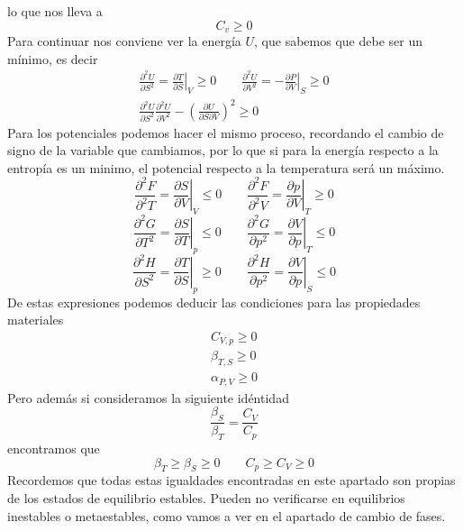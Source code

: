 lo que nos lleva a
\begin{equation}
C_v \geq 0
\end{equation}
Para continuar nos conviene ver la energía $U$, que sabemos que debe ser un mínimo, es decir
\begin{equation}
\begin{gathered}
\frac{\partial^2 U}{\partial S^2} = \left.\frac{\partial T}{\partial S}\right|_V \geq 0 \qquad
\frac{\partial^2 U}{\partial V^2} = - \left.\frac{\partial P}{\partial V}\right|_S \geq 0\\
\frac{\partial^2 U}{\partial S^2} \frac{\partial^2 U}{\partial V^2} - \left(\frac{\partial U}{\partial S \partial V}\right)^2 \geq 0
\end{gathered}
\end{equation}
Para los potenciales podemos hacer el mismo proceso, recordando el cambio de signo de la variable que cambiamos, por lo que si para la energía respecto a la entropía es un minimo, el potencial respecto a la temperatura será un máximo.
\begin{equation}
\left.\frac{\partial^2 F}{\partial^2 T}\right. = \left.\frac{\partial S}{\partial V}\right|_V \leq 0 \qquad
\left. \frac{\partial^2 F}{\partial^2 V}\right. = \left.\frac{\partial p}{\partial V}\right|_T \geq 0
\end{equation}
\begin{equation}
\left.\frac{\partial^2 G}{\partial T^2}\right. = \left.\frac{\partial S}{\partial T}\right|_p \leq 0 \qquad
\left.\frac{\partial^2 G}{\partial p^2}\right. = \left.\frac{\partial V}{\partial p}\right|_T \leq 0
\end{equation}
\begin{equation}
\left.\frac{\partial^2 H}{\partial S^2}\right. = \left.\frac{\partial T}{\partial S}\right|_p \geq 0 \qquad
\left.\frac{\partial^2 H}{\partial p^2}\right. = \left.\frac{\partial V}{\partial p}\right|_S \leq 0
\end{equation}
De estas expresiones podemos deducir las condiciones para las propiedades materiales
\begin{equation}
\begin{gathered}
C_{V,p} \geq 0\\
\beta_{T,S} \geq 0\\
\alpha_{P,V} \geq 0
\end{gathered}
\end{equation}
Pero además si consideramos la siguiente idéntidad
\begin{equation}
\frac{\beta_S}{\beta_T} = \frac{C_V}{C_p}
\end{equation}
encontramos que
\begin{equation}
\beta_T \geq \beta_S \geq 0 \qquad C_p \geq C_V \geq 0
\end{equation}
Recordemos que todas estas igualdades encontradas en este apartado son propias de los estados de equilibrio estables.
Pueden no verificarse en equilibrios inestables o metaestables, como vamos a ver en el apartado de cambio de fases.
